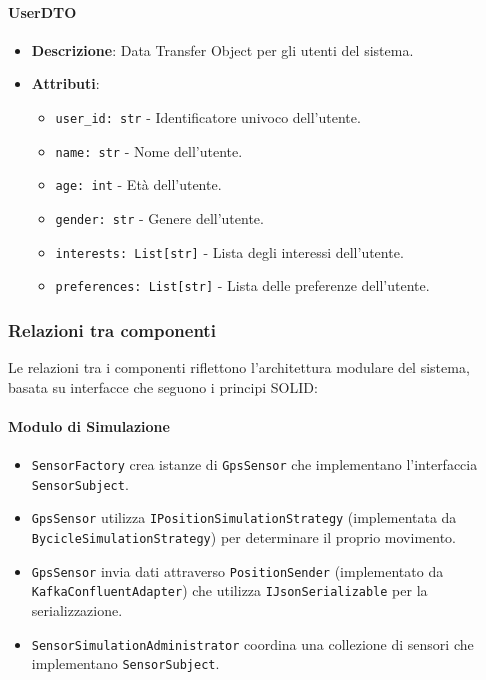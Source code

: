 \documentclass[10pt]{article}
\begin{document}
    \paragraph{UserDTO}
    \begin{itemize}
        \item \textbf{Descrizione}: Data Transfer Object per gli utenti del sistema.
        \item \textbf{Attributi}:
        \begin{itemize}
            \item \texttt{user\_id: str} - Identificatore univoco dell'utente.
            \item \texttt{name: str} - Nome dell'utente.
            \item \texttt{age: int} - Età dell'utente.
            \item \texttt{gender: str} - Genere dell'utente.
            \item \texttt{interests: List[str]} - Lista degli interessi dell'utente.
            \item \texttt{preferences: List[str]} - Lista delle preferenze dell'utente.
        \end{itemize}
    \end{itemize}

    \subsubsection{Relazioni tra componenti}
    Le relazioni tra i componenti riflettono l'architettura modulare del sistema, basata su interfacce che seguono i principi SOLID:

    \paragraph{Modulo di Simulazione}
    \begin{itemize}
        \item \texttt{SensorFactory} crea istanze di \texttt{GpsSensor} che implementano l'interfaccia \texttt{SensorSubject}.
        \item \texttt{GpsSensor} utilizza \texttt{IPositionSimulationStrategy} (implementata da \texttt{BycicleSimulationStrategy}) per determinare il proprio movimento.
        \item \texttt{GpsSensor} invia dati attraverso \texttt{PositionSender} (implementato da \texttt{KafkaConfluentAdapter}) che utilizza \texttt{IJsonSerializable} per la serializzazione.
        \item \texttt{SensorSimulationAdministrator} coordina una collezione di sensori che implementano \texttt{SensorSubject}.
    \end{itemize}
\end{document}
